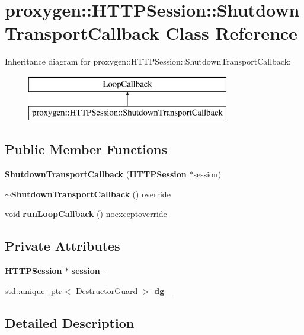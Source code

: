 \section{proxygen\+:\+:H\+T\+T\+P\+Session\+:\+:Shutdown\+Transport\+Callback Class Reference}
\label{classproxygen_1_1HTTPSession_1_1ShutdownTransportCallback}
Inheritance diagram for proxygen\+:\+:H\+T\+T\+P\+Session\+:\+:Shutdown\+Transport\+Callback\+:\begin{figure}[H]
\begin{center}
\leavevmode
\includegraphics[height=2.000000cm]{classproxygen_1_1HTTPSession_1_1ShutdownTransportCallback}
\end{center}
\end{figure}
\subsection*{Public Member Functions}
\begin{DoxyCompactItemize}
\item 
{\bf Shutdown\+Transport\+Callback} ({\bf H\+T\+T\+P\+Session} $\ast$session)
\item 
{\bf $\sim$\+Shutdown\+Transport\+Callback} () override
\item 
void {\bf run\+Loop\+Callback} () noexceptoverride
\end{DoxyCompactItemize}
\subsection*{Private Attributes}
\begin{DoxyCompactItemize}
\item 
{\bf H\+T\+T\+P\+Session} $\ast$ {\bf session\+\_\+}
\item 
std\+::unique\+\_\+ptr$<$ Destructor\+Guard $>$ {\bf dg\+\_\+}
\end{DoxyCompactItemize}


\subsection{Detailed Description}



